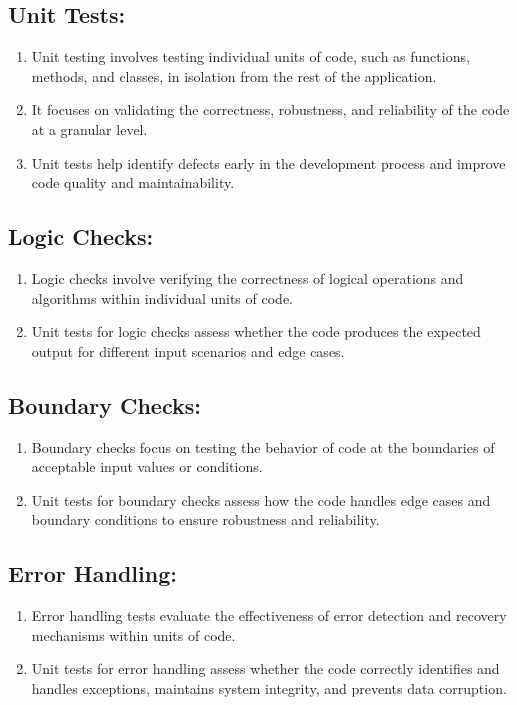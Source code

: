 \documentclass{article}
\begin{document}
\subsection{Unit Tests:}
\begin{enumerate}[label=\arabic*.]
    \item Unit testing involves testing individual units of code, such as functions, methods, and classes, in isolation from the rest of the application.
    \item It focuses on validating the correctness, robustness, and reliability of the code at a granular level.
    \item Unit tests help identify defects early in the development process and improve code quality and maintainability.
\end{enumerate}

\subsection{Logic Checks:}
\begin{enumerate}[label=\arabic*.]
    \item Logic checks involve verifying the correctness of logical operations and algorithms within individual units of code.
    \item Unit tests for logic checks assess whether the code produces the expected output for different input scenarios and edge cases.
\end{enumerate}

\subsection{Boundary Checks:}
\begin{enumerate}[label=\arabic*.]
    \item Boundary checks focus on testing the behavior of code at the boundaries of acceptable input values or conditions.
    \item Unit tests for boundary checks assess how the code handles edge cases and boundary conditions to ensure robustness and reliability.
\end{enumerate}

\subsection{Error Handling:}
\begin{enumerate}[label=\arabic*.]
    \item Error handling tests evaluate the effectiveness of error detection and recovery mechanisms within units of code.
    \item Unit tests for error handling assess whether the code correctly identifies and handles exceptions, maintains system integrity, and prevents data corruption.
\end{enumerate}
\end{document}
